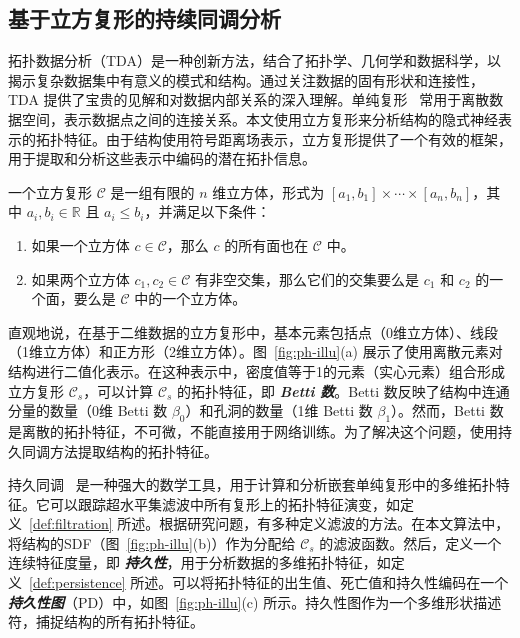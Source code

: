 \subsection{基于立方复形的持续同调分析}
\label{sec:PH}
拓扑数据分析（TDA）是一种创新方法，结合了拓扑学、几何学和数据科学，以揭示复杂数据集中有意义的模式和结构。通过关注数据的固有形状和连接性，TDA 提供了宝贵的见解和对数据内部关系的深入理解。单纯复形~\cite{rotman2013} 常用于离散数据空间，表示数据点之间的连接关系。本文使用立方复形来分析结构的隐式神经表示的拓扑特征。由于结构使用符号距离场表示，立方复形提供了一个有效的框架，用于提取和分析这些表示中编码的潜在拓扑信息。

\begin{definition}
    一个立方复形 $\mathcal{C}$ 是一组有限的 $n$ 维立方体，形式为 $[a_1, b_1] \times \cdots \times [a_n, b_n]$，其中 $a_i, b_i \in \mathbb{R}$ 且 $a_i \leq b_i$，并满足以下条件：

    \begin{enumerate}
        \item 如果一个立方体 $c \in \mathcal{C}$，那么 $c$ 的所有面也在 $\mathcal{C}$ 中。
        \item 如果两个立方体 $c_1, c_2 \in \mathcal{C}$ 有非空交集，那么它们的交集要么是 $c_1$ 和 $c_2$ 的一个面，要么是 $\mathcal{C}$ 中的一个立方体。
    \end{enumerate}

\end{definition}

直观地说，在基于二维数据的立方复形中，基本元素包括点（0维立方体）、线段（1维立方体）和正方形（2维立方体）。图~\ref{fig:ph-illu}(a) 展示了使用离散元素对结构进行二值化表示。在这种表示中，密度值等于1的元素（实心元素）组合形成立方复形 $\mathcal{C}_s$，可以计算 $\mathcal{C}_s$ 的拓扑特征，即 \textbf{\textit{Betti 数}}。Betti 数反映了结构中连通分量的数量（0维 Betti 数 $\beta_0$）和孔洞的数量（1维 Betti 数 $\beta_1$）。然而，Betti 数是离散的拓扑特征，不可微，不能直接用于网络训练。为了解决这个问题，使用持久同调方法提取结构的拓扑特征。

持久同调~\cite{edelsbrunner2000} 是一种强大的数学工具，用于计算和分析嵌套单纯复形中的多维拓扑特征。它可以跟踪超水平集滤波中所有复形上的拓扑特征演变，如定义~\ref{def:filtration} 所述。根据研究问题，有多种定义滤波的方法。在本文算法中，将结构的SDF（图~\ref{fig:ph-illu}(b)）作为分配给 $\mathcal{C}_s$ 的滤波函数。然后，定义一个连续特征度量，即 \textbf{\textit{持久性}}，用于分析数据的多维拓扑特征，如定义~\ref{def:persistence} 所述。可以将拓扑特征的出生值、死亡值和持久性编码在一个 \textbf{\textit{持久性图}}（PD）中，如图~\ref{fig:ph-illu}(c) 所示。持久性图作为一个多维形状描述符，捕捉结构的所有拓扑特征。

